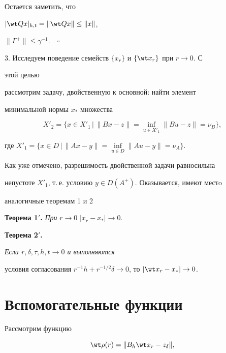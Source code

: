Остается заметить, что 


$|\wt Q x|_{h,t}=\|\wt Q x\|\le \|x\|$, 


$\|\Gamma^+\|\le\gamma^{-1}$.$\quad\square$ 


 


3. Исследуем поведение семейств $\{x_r\}$ и $\{\wt x_r\}$ при $r\to0$. С 


этой целью  


рассмотрим задачу, двойственную к основной: найти элемент  


минимальной нормы $x_*$ множества 


$$ 


X'_2=\{x\in X'_1\,\big|\,\|B x-z\|=\inf_{u\in X'_1}\|B u-z\|=\nu_B\}, 


$$ 


где $X'_1=\{x\in D\,\big|\,\|Ax-y\|=\inf\limits_{u\in D} 


\|A u-y\|=\nu_A\}$. 


 


Как уже отмечено, разрешимость двойственной задачи равносильна  


непустоте $X'_1$, т.\,е. условию $y\in D(A^+)$. Оказывается, имеют местo 


аналогичные теоремам 1 и 2  


\medskip 


 


{\bf Теорема 1$'$.} {\it При} $r\to0$\; $|x_r-x_*|\to0$. 


\medskip 


 


{\bf Теорема 2$'$.} {\it Если $r,\delta,\tau,h,t\to0$ и выполняются 


условия согласования $r^{-1}h+r^{-1/2}\delta\to0$, то $|\wt 


x_r-x_*|\to0$. 


} 


 


\section{Вспомогательные функции} 


 


Рассмотрим функцию 


\begin{equation} 


\wt\rho(r)=\|B_h\wt x_r-z_\delta\|, 


\end{equation} 


